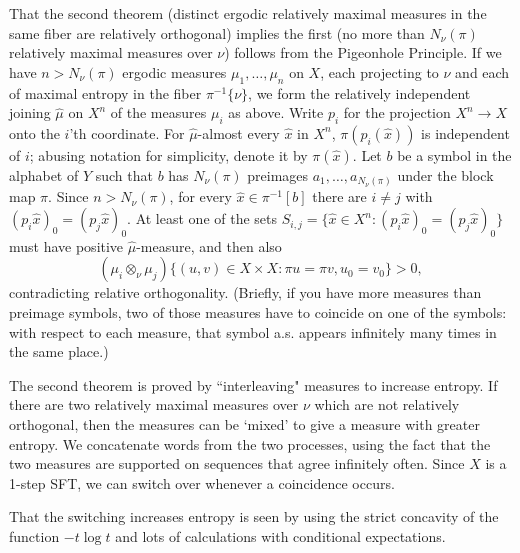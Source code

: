 \documentclass{kepart2010}
\theoremstyle{plain}
\theoremstyle{definition}
\theoremstyle{remark}
\theoremstyle{definition}
\numberwithin{equation}{section}
\begin{document}
That the second theorem (distinct ergodic relatively maximal
measures in the same fiber are relatively orthogonal) implies the
first (no more than $N_{\nu}(\pi)$ relatively maximal measures over
$\nu$)
follows from the Pigeonhole Principle. If we have $n
> N_\nu(\pi)$ ergodic measures $\mu_1,\ldots,\mu_n$
  on $X$, each projecting to $\nu$ and each of maximal entropy in the
  fiber $\pi^{-1}\{ \nu\}$,
we form the relatively independent joining $\hat\mu$ on $X^n$  of
the
  measures $\mu_i$ as above.
Write $p_i$ for the projection $X^n\to X$ onto the $i$'th
  coordinate.
 For $\hat\mu$-almost every $\hat x$ in
  $X^n$, $\pi(p_i(\hat x))$ is independent of $i$;
abusing notation for simplicity, denote it by $\pi
  (\hat x)$.
  Let $b$ be a symbol in the alphabet of $Y$ such that $b$ has
  $N_\nu(\pi)$ preimages $a_1,\dots ,a_{N_\nu(\pi)}$ under the block map $\pi$.
Since $n > N_\nu(\pi )$, for every $\hat x \in \pi^{-1}[b]$ there
are $i \neq j$ with $(p_i \hat x)_0 = (p_j \hat x)_0$. At least one
of the sets $S_{i,j} = \{ \hat x \in X^n : (p_i \hat x)_0 = (p_j
\hat x)_0 \}$ must have positive $\hat\mu$-measure, and then also
\begin{equation} (\mu_i \otimes _\nu \mu_{j}) \{(u,v) \in X \times X: \pi u = \pi
v, u_0 = v_0 \} > 0, \end{equation}
 contradicting relative orthogonality.
(Briefly, if you have more measures than preimage symbols, two of
those measures have to coincide on one of the symbols: with respect
to each measure, that symbol a.s. appears infinitely many times in
the same place.)

The second theorem is proved by ``interleaving" measures to increase
entropy.
  If there are two relatively maximal measures over $\nu$ which are
  not relatively orthogonal, then the measures can be
  `mixed' to give a measure with greater entropy.
We concatenate words from the two processes, using the fact that the
two measures are supported on sequences that agree infinitely often.
Since $X$ is a 1-step SFT, we can switch over whenever a
{coincidence} occurs.

That the switching {increases entropy} is seen by using the strict
concavity of the function $-t \log t$ and lots of calculations with
conditional expectations.
\end{document}
